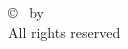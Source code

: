 
\clearpage
\vspace*{\fill}
\begin{center}
\begin{minipage}{.6\textwidth}
\vspace*{0.25in}
\begin{center}
    \copyright~ \thesisyear{} by \thesisauthor{} \\
    All rights reserved
\end{center}
\end{minipage}
\end{center}
\vfill %
\clearpage